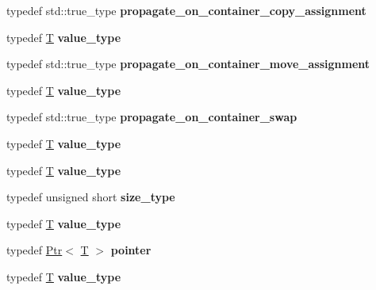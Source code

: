 \begin{DoxyCompactItemize}
typedef std\+::true\+\_\+type {\bfseries propagate\+\_\+on\+\_\+container\+\_\+copy\+\_\+assignment}
\item 
\mbox{\label{struct_a_ae136ecf80b1597fcfaa23e26cbcdbb6c}} 
typedef \mbox{\hyperlink{struct_t}{T}} {\bfseries value\+\_\+type}
\item 
\mbox{\label{struct_a_a11ac1672b4c13a98d75c856a6483b510}} 
typedef std\+::true\+\_\+type {\bfseries propagate\+\_\+on\+\_\+container\+\_\+move\+\_\+assignment}
\item 
\mbox{\label{struct_a_ae136ecf80b1597fcfaa23e26cbcdbb6c}} 
typedef \mbox{\hyperlink{struct_t}{T}} {\bfseries value\+\_\+type}
\item 
\mbox{\label{struct_a_aad00979da9448f5545014284ab37b74b}} 
typedef std\+::true\+\_\+type {\bfseries propagate\+\_\+on\+\_\+container\+\_\+swap}
\item 
\mbox{\label{struct_a_ae136ecf80b1597fcfaa23e26cbcdbb6c}} 
typedef \mbox{\hyperlink{struct_t}{T}} {\bfseries value\+\_\+type}
\item 
\mbox{\label{struct_a_ae136ecf80b1597fcfaa23e26cbcdbb6c}} 
typedef \mbox{\hyperlink{struct_t}{T}} {\bfseries value\+\_\+type}
\item 
\mbox{\label{struct_a_a26b15d0a4f65395554fa1fa97e3e841c}} 
typedef unsigned short {\bfseries size\+\_\+type}
\item 
\mbox{\label{struct_a_ae136ecf80b1597fcfaa23e26cbcdbb6c}} 
typedef \mbox{\hyperlink{struct_t}{T}} {\bfseries value\+\_\+type}
\item 
\mbox{\label{struct_a_ab6399b214c0b32028df6a3c5b3ac5a16}} 
typedef \mbox{\hyperlink{struct_ptr}{Ptr}}$<$ \mbox{\hyperlink{struct_t}{T}} $>$ {\bfseries pointer}
\item 
\mbox{\label{struct_a_ae136ecf80b1597fcfaa23e26cbcdbb6c}} 
typedef \mbox{\hyperlink{struct_t}{T}} {\bfseries value\+\_\+type}
\item 
\mbox{\label{struct_a_ae136ecf80b1597fcfaa23e26cbcdbb6c}} 

\end{DoxyCompactItemize}

